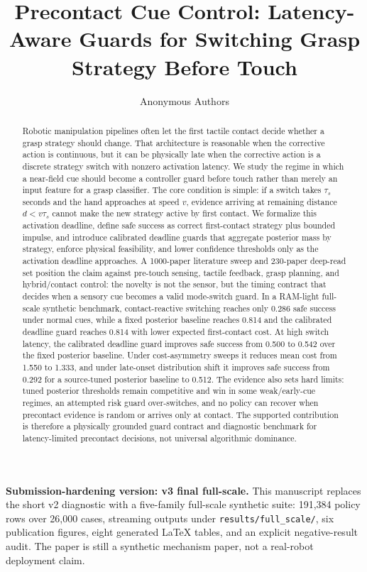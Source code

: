 \documentclass{article}
\title{Precontact Cue Control: Latency-Aware Guards for Switching Grasp Strategy Before Touch}
\author{Anonymous Authors}
\begin{document}
\maketitle

\noindent\textbf{Submission-hardening version: v3 final full-scale.}
This manuscript replaces the short v2 diagnostic with a five-family full-scale synthetic suite: 191,384 policy rows over 26,000 cases, streaming outputs under \texttt{results/full\_scale/}, six publication figures, eight generated \LaTeX{} tables, and an explicit negative-result audit. The paper is still a synthetic mechanism paper, not a real-robot deployment claim.

\begin{abstract}
Robotic manipulation pipelines often let the first tactile contact decide whether a grasp strategy should change. That architecture is reasonable when the corrective action is continuous, but it can be physically late when the corrective action is a discrete strategy switch with nonzero activation latency. We study the regime in which a near-field cue should become a controller guard before touch rather than merely an input feature for a grasp classifier. The core condition is simple: if a switch takes $\tau_s$ seconds and the hand approaches at speed $v$, evidence arriving at remaining distance $d < v\tau_s$ cannot make the new strategy active by first contact. We formalize this activation deadline, define safe success as correct first-contact strategy plus bounded impulse, and introduce calibrated deadline guards that aggregate posterior mass by strategy, enforce physical feasibility, and lower confidence thresholds only as the activation deadline approaches. A 1000-paper literature sweep and 230-paper deep-read set position the claim against pre-touch sensing, tactile feedback, grasp planning, and hybrid/contact control: the novelty is not the sensor, but the timing contract that decides when a sensory cue becomes a valid mode-switch guard. In a RAM-light full-scale synthetic benchmark, contact-reactive switching reaches only 0.286 safe success under normal cues, while a fixed posterior baseline reaches 0.814 and the calibrated deadline guard reaches 0.814 with lower expected first-contact cost. At high switch latency, the calibrated deadline guard improves safe success from 0.500 to 0.542 over the fixed posterior baseline. Under cost-asymmetry sweeps it reduces mean cost from 1.550 to 1.333, and under late-onset distribution shift it improves safe success from 0.292 for a source-tuned posterior baseline to 0.512. The evidence also sets hard limits: tuned posterior thresholds remain competitive and win in some weak/early-cue regimes, an attempted risk guard over-switches, and no policy can recover when precontact evidence is random or arrives only at contact. The supported contribution is therefore a physically grounded guard contract and diagnostic benchmark for latency-limited precontact decisions, not universal algorithmic dominance.
\end{abstract}
\end{document}
